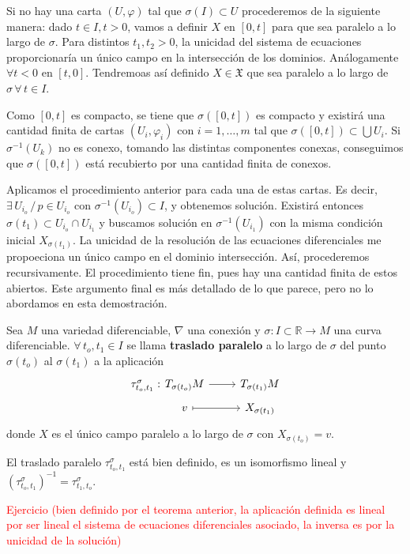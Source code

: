 \begin{dem}
    Si no hay una carta $(U, \varphi)$ tal que $\sigma(I)\subset U$ procederemos de la siguiente manera: dado $t \in I, t>0$, vamos a definir $X$ en $[0,t]$ para que sea paralelo a lo largo de $\sigma$. Para distintos $t_1,t_2> 0 $, la unicidad del sistema de ecuaciones proporcionaría un único campo en la intersecci\'on de los dominios. An\'alogamente $\forall t< 0$ en $[t,0]$. Tendremoas as\'i definido $X \in \mathfrak X$ que sea paralelo a lo largo de $\sigma \, \forall \, t \in I$. 
    
    Como $[0,t]$ es compacto, se tiene que $\sigma([0,t])$ es compacto y existirá una cantidad finita de cartas $(U_i,\varphi_i)$ con $i=1,\ldots, m$ tal que  $\sigma([0,t]) \subset \bigcup U_i$. Si $\sigma^{-1}(U_k)$ no es conexo, tomando las distintas componentes conexas, conseguimos que $\sigma([0,t])$ est\'a recubierto por una cantidad finita de conexos.

    Aplicamos el procedimiento anterior para cada una de estas cartas. Es decir, $\exists \, U_{i_o} \, / \, p \in U_{i_o}$ con $\sigma^{-1}(U_{i_o})\subset I$, y obtenemos soluci\'on. Existir\'a entonces $\sigma(t_1)\subset U_{i_o} \cap U_{i_1}$ y buscamos soluci\'on en $\sigma^{-1}(U_{i_1})$ con la misma condici\'on inicial $X_{\sigma(t_1)}$. La unicidad de la resoluci\'on de las ecuaciones diferenciales me propoeciona un \'unico campo en el dominio intersecci\'on. Así, procederemos recursivamente. El procedimiento tiene fin, pues hay una cantidad finita de estos abiertos. Este argumento final es más detallado de lo que parece, pero no lo abordamos en esta demostración.
\end{dem}

\begin{defi}
    Sea $M$ una variedad diferenciable, $\nabla$ una conexión y $\sigma: I \subset \mathbb R \to M$ una curva diferenciable. $\forall \, t_o,t_1 \in I$ se llama \textbf{traslado paralelo} a lo largo de $\sigma$ del punto $\sigma(t_o)$ al $\sigma(t_1)$ a la aplicación $$\begin{tikzcd}
    \tau_{t_o,t_1}^{\sigma}: \hspace{-10mm} & T_{\sigma(t_o)}M \rar & T_{\sigma(t_1)}M\\[-5mm]
    & v \arrow[mapsto]{r} & X_{\sigma(t_1)}
    \end{tikzcd}$$
    donde $X$ es el único campo paralelo a lo largo de $\sigma$ con $X_{\sigma(t_o)} = v$.
\end{defi}

\begin{prop}
    El traslado paralelo $\tau_{t_o,t_1}^{\sigma}$ está bien definido, es un isomorfismo lineal y $(\tau_{t_o,t_1}^{\sigma})^{-1} = \tau_{t_1,t_o}^{\sigma}$.
\end{prop}
\begin{dem}
    \textcolor{red}{Ejercicio (bien definido por el teorema anterior, la aplicación definida es lineal por ser lineal el sistema de ecuaciones diferenciales asociado, la inversa es por la unicidad de la soluci\'on)}
\end{dem}

